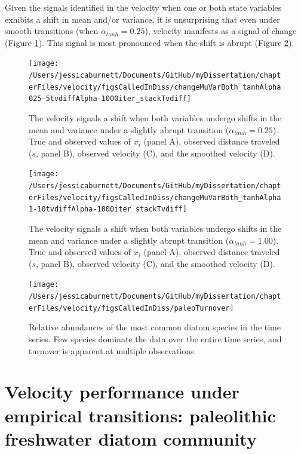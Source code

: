 \documentclass[12pt,twoside,openany]{reedthesis}
\begin{document}
Given the signals identified in the velocity when one or both state variables exhibits a shift in mean and/or variance, it is unsurprising that even under smooth transitions (when \(\alpha_{tanh} = 0.25\)), velocity manifests as a signal of change (Figure \ref{fig:muVarBoth25}). This signal is most pronounced when the shift is abrupt (Figure \ref{fig:muVarBoth1}).
\begin{figure}
\texttt{[image: /Users/jessicaburnett/Documents/GitHub/myDissertation/chapterFiles/velocity/figsCalledInDiss/changeMuVarBoth\_tanhAlpha025-5tvdiffAlpha-1000iter\_stackTvdiff]} \caption{The velocity signals a shift when both variables undergo shifts in the mean and variance under a slightly abrupt transition ($\alpha_{tanh}=0.25$). True and observed values of $x_i$ (panel A), observed distance traveled ($s$, panel B), observed velocity (C), and the smoothed velocity (D).}\label{fig:muVarBoth25}
\end{figure}
\newpage
\begin{figure}
\texttt{[image: /Users/jessicaburnett/Documents/GitHub/myDissertation/chapterFiles/velocity/figsCalledInDiss/changeMuVarBoth\_tanhAlpha1-10tvdiffAlpha-1000iter\_stackTvdiff]} \caption{The velocity signals a shift when both variables undergo shifts in the mean and variance under a slightly abrupt transition ($\alpha_{tanh}=1.00$). True and observed values of $x_i$ (panel A), observed distance traveled ($s$, panel B), observed velocity (C), and the smoothed velocity (D).}\label{fig:muVarBoth1}
\end{figure}
\newpage

\newpage
\begin{figure}
\texttt{[image: /Users/jessicaburnett/Documents/GitHub/myDissertation/chapterFiles/velocity/figsCalledInDiss/paleoTurnover]} \caption{Relative abundances of the most common diatom species in the time series. Few species dominate the data over the entire time series, and turnover is apparent at multiple observations.}\label{fig:paleoTurnover}
\end{figure}
\hypertarget{velocity-performance-under-empirical-transitions-paleolithic-freshwater-diatom-community}{%
\section{Velocity performance under empirical transitions: paleolithic freshwater diatom community}\label{velocity-performance-under-empirical-transitions-paleolithic-freshwater-diatom-community}}
\end{document}
